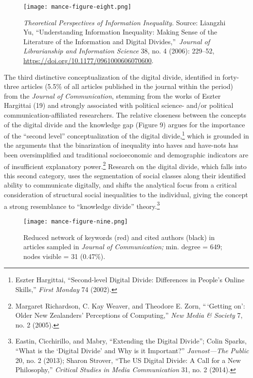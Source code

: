 \documentclass{tufte-handout}
\begin{document}
\begin{figure}
    \centering
    \texttt{[image: mance-figure-eight.png]}
    \caption{\emph{Theoretical Perspectives of Information Inequality.}
Source: Liangzhi Yu, ``Understanding Information Inequality: Making
Sense of the Literature of the Information and Digital
Divides,''~\emph{Journal of Librarianship and Information Science} 38,
no. 4 (2006): 229--52, \url{https://doi.org/10.1177/0961000606070600}.}
    \label{fig:eight}
\end{figure}


The third distinctive conceptualization of the digital divide,
identified in forty-three articles (5.5\% of all articles published in
the journal within the period) from the \emph{Journal of Communication},
stemming from the works of Eszter Hargittai (19) and strongly associated
with political science- and/or political communication-affiliated
researchers. The relative closeness between the concepts of the digital
divide and the knowledge gap (Figure 9) argues for the importance of the
``second level'' conceptualization of the digital divide,\footnote{Eszter
  Hargittai, ``Second-level Digital Divide: Differences in People's
  Online Skills,'' \emph{First Monday} 74 (2002).} which is grounded in
the arguments that the binarization of inequality into haves and
have-nots has been oversimplified and traditional socioeconomic and
demographic indicators are of insufficient explanatory power.\footnote{Margaret
  Richardson, C. Kay Weaver, and Theodore E. Zorn, ``\,`Getting on':
  Older New Zealanders' Perceptions of Computing,'' \emph{New Media \&
  Society} 7, no. 2 (2005).} Research on the digital divide, which falls
into this second category, uses the segmentation of social classes along
their identified ability to communicate digitally, and shifts the
analytical focus from a critical consideration of structural social
inequalities to the individual, giving the concept a strong resemblance
to ``knowledge divide'' theory.\footnote{Eastin, Cicchirillo, and Mabry,
  ``Extending the Digital Divide''; Colin Sparks, ``What is the `Digital
  Divide' and Why is it Important?'' \emph{Javnost---The Public} 20, no.
  2 (2013); Sharon Strover, ``The US Digital Divide: A Call for a New
  Philosophy,'' \emph{Critical Studies in Media Communication} 31, no. 2
  (2014).}
  
  \begin{figure}
    \centering
    \texttt{[image: mance-figure-nine.png]}
    \caption{Reduced network of keywords (red) and cited authors (black) in
articles sampled in \emph{Journal of Communication;} min. degree = 649;
nodes visible = 31 (0.47\%).}
    \label{fig:nine}
\end{figure}
\end{document}
